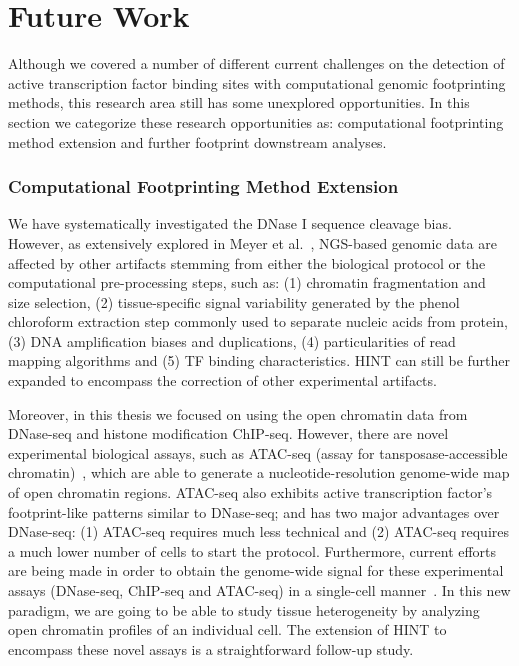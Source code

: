 \section{Future Work}
\label{sec:future.work}

Although we covered a number of different current challenges on the detection of active transcription factor binding sites with computational genomic footprinting methods, this research area still has some unexplored opportunities. In this section we categorize these research opportunities as: computational footprinting method extension and further footprint downstream analyses.

\subsubsection{Computational Footprinting Method Extension}

We have systematically investigated the DNase I sequence cleavage bias. However, as extensively explored in Meyer et al.~\cite{meyer2014}, NGS-based genomic data are affected by other artifacts stemming from either the biological protocol or the computational pre-processing steps, such as: (1) chromatin fragmentation and size selection, (2) tissue-specific signal variability generated by the phenol chloroform extraction step commonly used to separate nucleic acids from protein, (3) DNA amplification biases and duplications, (4) particularities of read mapping algorithms and (5) TF binding characteristics. HINT can still be further expanded to encompass the correction of other experimental artifacts.

Moreover, in this thesis we focused on using the open chromatin data from DNase-seq and histone modification ChIP-seq. However, there are novel experimental biological assays, such as ATAC-seq (assay for tansposase-accessible chromatin)~\cite{buenrostro2013}, which are able to generate a nucleotide-resolution genome-wide map of open chromatin regions. ATAC-seq also exhibits active transcription factor's footprint-like patterns similar to DNase-seq; and has two major advantages over DNase-seq: (1) ATAC-seq requires much less technical and (2) ATAC-seq requires a much lower number of cells to start the protocol. Furthermore, current efforts are being made in order to obtain the genome-wide signal for these experimental assays (DNase-seq, ChIP-seq and ATAC-seq) in a single-cell manner~\cite{buenrostro2015}. In this new paradigm, we are going to be able to study tissue heterogeneity by analyzing open chromatin profiles of an individual cell. The extension of HINT to encompass these novel assays is a straightforward follow-up study.

